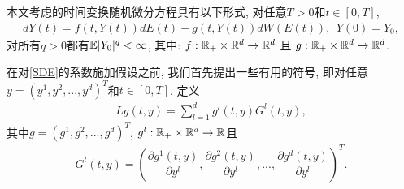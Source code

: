 本文考虑的时间变换随机微分方程具有以下形式, 对任意$T>0$和$t\in [0,T]$,
\begin{align}\label{SDE}
    dY(t) = f(t,Y(t))dE(t) + g(t,Y(t))dW(E(t)),~~Y(0) = Y_0,
\end{align}
对所有$q > 0$都有$\mathbb{E} |Y_0|^q < \infty$, 其中: $f: \mathbb{R}_+ \times \mathbb{R}^d \rightarrow \mathbb{R}^d$ 且 $g: \mathbb{R}_+ \times \mathbb{R}^d \rightarrow \mathbb{R}^{d}$. 

在对\eqref{SDE}的系数施加假设之前, 我们首先提出一些有用的符号, 即对任意$y=(y^{1},y^{2},...,y^{d})^{T}$和$t \in [0, T]$, 定义
\begin{align*}
    Lg(t,y)=\sum_{l=1}^{d}g^{l}(t,y)G^{l}(t,y),
\end{align*}
其中$g=(g^{1},g^{2},...,g^{d})^{T}$, $g^{l}:\mathbb{R}_+ \times \mathbb{R}^d \rightarrow \mathbb{R}$且
\begin{align*}
    G^{l}(t,y)=(\dfrac{\partial g^{1}(t,y)}{\partial y^{l}},\dfrac{\partial g^{2}(t,y)}{\partial y^{l}},...,\dfrac{\partial g^{d}(t,y)}{\partial y^{l}})^{T}.
\end{align*}
\par

